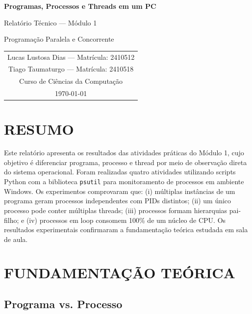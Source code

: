 \documentclass[12pt,a4paper]{article}
\begin{document}
\begin{center}
    \vspace{-2em}
    {\LARGE \textbf{Programas, Processos e Threads em um PC}}\par\vspace{0.5em}
    {\large Relatório Técnico — Módulo 1}\par\vspace{0.3em}
    {\large Programação Paralela e Concorrente}\par\vspace{1em}

    \begin{tabular}{c}
    Lucas Lustosa Dias — Matrícula: 2410512 \\
    Tiago Taumaturgo — Matrícula: 2410518 \\
    Curso de Ciências da Computação \\
    \today
    \end{tabular}
\end{center}
\vspace{1em}

\section{RESUMO}

Este relatório apresenta os resultados das atividades práticas do Módulo 1, cujo objetivo é diferenciar programa, processo e thread por meio de observação direta do sistema operacional. Foram realizadas quatro atividades utilizando scripts Python com a biblioteca \texttt{psutil} para monitoramento de processos em ambiente Windows. Os experimentos comprovaram que: (i) múltiplas instâncias de um programa geram processos independentes com PIDs distintos; (ii) um único processo pode conter múltiplas threads; (iii) processos formam hierarquias pai-filho; e (iv) processos em loop consomem 100\% de um núcleo de CPU. Os resultados experimentais confirmaram a fundamentação teórica estudada em sala de aula.

\section{FUNDAMENTAÇÃO TEÓRICA}

\subsection{Programa vs. Processo}
\end{document}
